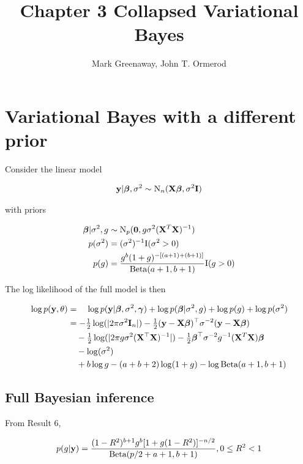 \documentclass{amsart}[12pt]
\title{Chapter 3 Collapsed Variational Bayes}
\author{Mark Greenaway, John T. Ormerod}
\theoremstyle{definition}
\begin{document}
\section{Variational Bayes with a different prior}

Consider the linear model

\begin{align*}
	{\bf y} | {\boldsymbol \beta}, \sigma^2 \sim \text{N}_n({\bf X} {\boldsymbol \beta}, \sigma^2 {\bf I}) 
\end{align*}

with priors

\begin{align*}
	{\boldsymbol\beta} | \sigma^2, g & \sim \text{N}_p({\bf 0}, g \sigma^2 ({\bf X}^T {\bf X})^{-1})                             \\
	p(\sigma^2)          & = (\sigma^2)^{-1} \text{I}(\sigma^2 > 0)                                         \\
	p(g)                 & = \frac{g^b (1 + g)^{-[(a + 1) + (b + 1)]}}{\text{Beta}(a + 1, b + 1)} \text{I}(g > 0) 
\end{align*}

The log likelihood of the full model is then

\begin{align*}
	\log p({\bf y}, \theta) & = \quad\log p({\bf y}|{\boldsymbol \beta}, \sigma^2, {\boldsymbol \gamma}) + \log p({\boldsymbol \beta} | \sigma^2, g) +  \log p(g) + \log p(\sigma^2)        \\
	                    & = -\tfrac{1}{2} \log(|2 \pi \sigma^2 {\bf I}_n|) - \tfrac{1}{2} ({\bf y} - {\bf X} {\boldsymbol \beta})^\top \sigma^{-2} ({\bf y} - {\bf X} {\boldsymbol \beta})               \\
	                    & \quad -\tfrac{1}{2} \log(|2 \pi g \sigma^2 ({\bf X}^\top {\bf X})^{-1}|) -\tfrac{1}{2} {\boldsymbol \beta}^\top \sigma^{-2} g^{-1} ({\bf X}^T {\bf X}) {\boldsymbol \beta} \\
	                    & \quad - \log (\sigma^2)                                                                                            \\
	                    & \quad + b \log g - (a + b + 2) \log (1 + g) - \log \text{Beta}(a + 1, b + 1)                                             
\end{align*}


\subsection{Full Bayesian inference}

From Result 6,

\[
	p(g|{\bf y}) = \frac{(1-R^2)^{b+1} g^b [1 + g(1-R^2)]^{-n/2}}{\text{Beta}{(p/2 + a + 1, b + 1)}}, 0 \leq R^2 < 1
\]
\end{document}
